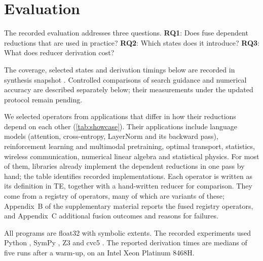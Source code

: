 \section{Evaluation}
\label{sec:eval}

The recorded evaluation addresses three questions.
\textbf{RQ1}: Does \sys fuse dependent reductions that are used in practice?
\textbf{RQ2}: Which states does it introduce?
\textbf{RQ3}: What does reducer derivation cost?

The coverage, selected states and derivation timings below are recorded in synthesis snapshot .
Controlled comparisons of search guidance and numerical accuracy are described separately below; their measurements under the updated protocol remain pending.


We selected \nShowcase operators from applications that differ in how their reductions depend on each other (\cref{tab:showcase}).
Their applications include language models (attention, cross-entropy, LayerNorm and its backward pass), reinforcement learning and multimodal pretraining, optimal transport, statistics, wireless communication, numerical linear algebra and statistical physics.
For most of them, libraries already implement the dependent reductions in one pass by hand; the table identifies recorded implementations.
Each operator is written as its definition in TE, together with a hand-written reducer for comparison.
They come from a registry of \nRegistry operators, many of which are variants of these; Appendix~B of the supplementary material reports the fused registry operators, and Appendix~C additional fusion outcomes and reasons for failures.


All programs are float32 with symbolic extents.
The recorded experiments used Python \pythonVersion, SymPy \sympyVersion, Z3 \zThreeVersion and cvc5 \cvcFiveVersion.
The reported derivation times are medians of five runs after a warm-up, on an Intel Xeon Platinum 8468H.

